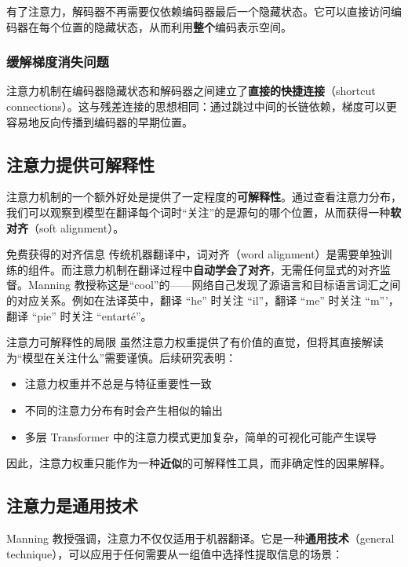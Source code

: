 \documentclass[a4paper]{article}
\begin{document}
有了注意力，解码器不再需要仅依赖编码器最后一个隐藏状态。它可以直接访问编码器在每个位置的隐藏状态，从而利用\textbf{整个}编码表示空间。

\subsubsection{缓解梯度消失问题}

注意力机制在编码器隐藏状态和解码器之间建立了\textbf{直接的快捷连接}（shortcut connections）。这与残差连接的思想相同：通过跳过中间的长链依赖，梯度可以更容易地反向传播到编码器的早期位置。

\subsection{注意力提供可解释性}

注意力机制的一个额外好处是提供了一定程度的\textbf{可解释性}。通过查看注意力分布，我们可以观察到模型在翻译每个词时``关注''的是源句的哪个位置，从而获得一种\textbf{软对齐}（soft alignment）。

\begin{knowledgebox}{免费获得的对齐信息}
传统机器翻译中，词对齐（word alignment）是需要单独训练的组件。而注意力机制在翻译过程中\textbf{自动学会了对齐}，无需任何显式的对齐监督。Manning 教授称这是``cool''的——网络自己发现了源语言和目标语言词汇之间的对应关系。例如在法译英中，翻译 ``he'' 时关注 ``il''，翻译 ``me'' 时关注 ``m'''，翻译 ``pie'' 时关注 ``entart\'{e}''。
\end{knowledgebox}

\begin{warningbox}{注意力可解释性的局限}
虽然注意力权重提供了有价值的直觉，但将其直接解读为``模型在关注什么''需要谨慎。后续研究表明：
\begin{itemize}
    \item 注意力权重并不总是与特征重要性一致
    \item 不同的注意力分布有时会产生相似的输出
    \item 多层 Transformer 中的注意力模式更加复杂，简单的可视化可能产生误导
\end{itemize}
因此，注意力权重只能作为一种\textbf{近似}的可解释性工具，而非确定性的因果解释。
\end{warningbox}

\subsection{注意力是通用技术}

Manning 教授强调，注意力不仅仅适用于机器翻译。它是一种\textbf{通用技术}（general technique），可以应用于任何需要从一组值中选择性提取信息的场景：
\end{document}

